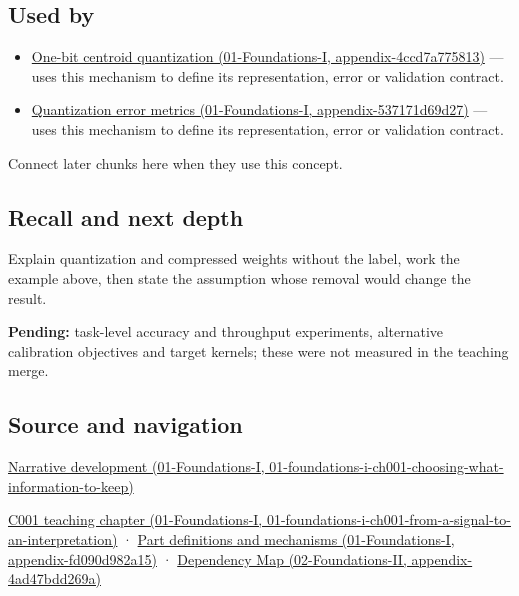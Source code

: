 \subsection{Used by}\label{appendix-fdc7879e8bf2-used-by}

\begin{itemize}
\tightlist
\item
  \href{../01-Foundations-I/main.pdf\#nameddest=appendix-4ccd7a775813}{One-bit centroid quantization (01-Foundations-I, appendix-4ccd7a775813)} --- uses this mechanism to define its representation, error or validation contract.
\item
  \href{../01-Foundations-I/main.pdf\#nameddest=appendix-537171d69d27}{Quantization error metrics (01-Foundations-I, appendix-537171d69d27)} --- uses this mechanism to define its representation, error or validation contract.
\end{itemize}

Connect later chunks here when they use this concept.

\subsection{Recall and next depth}\label{appendix-fdc7879e8bf2-recall-and-next-depth}

Explain quantization and compressed weights without the label, work the example above, then state the assumption whose removal would change the result.

\textbf{Pending:} task-level accuracy and throughput experiments, alternative calibration objectives and target kernels; these were not measured in the teaching merge.

\subsection{Source and navigation}\label{appendix-fdc7879e8bf2-source-and-navigation}

\href{../01-Foundations-I/main.pdf\#nameddest=01-foundations-i-ch001-choosing-what-information-to-keep}{Narrative development (01-Foundations-I, 01-foundations-i-ch001-choosing-what-information-to-keep)}

\href{../01-Foundations-I/main.pdf\#nameddest=01-foundations-i-ch001-from-a-signal-to-an-interpretation}{C001 teaching chapter (01-Foundations-I, 01-foundations-i-ch001-from-a-signal-to-an-interpretation)} · \href{../01-Foundations-I/main.pdf\#nameddest=appendix-fd090d982a15}{Part definitions and mechanisms (01-Foundations-I, appendix-fd090d982a15)} · \href{../02-Foundations-II/main.pdf\#nameddest=appendix-4ad47bdd269a}{Dependency Map (02-Foundations-II, appendix-4ad47bdd269a)}
